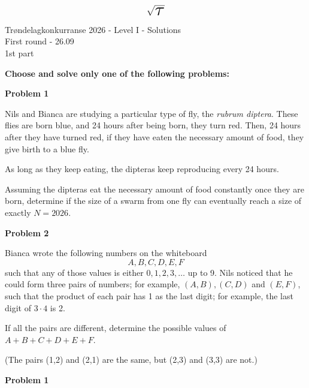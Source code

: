 \documentclass[a4paper,12pt]{article}
\begin{document}
\begingroup
\setlength{\parindent}{0pt}

\begin{center}
	\huge $$\sqrt{\scalebox{2.1}{$\tau$}}$$
	\Large Trøndelagkonkurranse 2026 - Level I - Solutions\\[2pt] First round - 26.09\\
	1st part
\end{center}
\vspace{1cm}

{\bf Choose and solve only one of the following problems:}

\vspace{.7cm}
{\bf Problem 1}

Nils and Bianca are studying a particular type of fly, the {\it rubrum diptera}. These flies are born blue, and 24 hours after being born, they turn red. Then, 24 hours after they have turned red, if they have eaten the necessary amount of food, they give birth to a blue fly.

As long as they keep eating, the dipteras keep reproducing every 24 hours.

Assuming the dipteras eat the necessary amount of food constantly once they are born, determine if the size of a swarm from one fly can eventually reach a size of exactly $N=2026$. 

\vspace{.7cm}
{\bf Problem 2}

Bianca wrote the following numbers on the whiteboard
$$A,B,C,D,E,F$$
such that any of those values is either $0,1,2,3,\ldots$ up to 9. Nils noticed that he could form three pairs of numbers; for example, $(A,B),(C,D)$ and $(E,F)$, such that the product of each pair has 1 as the last digit; for example, the last digit of $3\cdot4$ is 2.

If all the pairs are different, determine the possible values of $A+B+C+D+E+F$.

(The pairs (1,2) and (2,1) are the same, but (2,3) and (3,3) are not.)

\newpage %

{\bf Problem 1}
\end{document}
